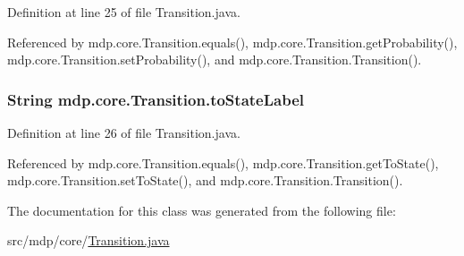 Definition at line 25 of file Transition.\+java.



Referenced by mdp.\+core.\+Transition.\+equals(), mdp.\+core.\+Transition.\+get\+Probability(), mdp.\+core.\+Transition.\+set\+Probability(), and mdp.\+core.\+Transition.\+Transition().

\hypertarget{classmdp_1_1core_1_1_transition_ac820d803424e51b25a3a6c895b94a33a}{}
\subsubsection[{to\+State\+Label}]{\setlength{\rightskip}{0pt plus 5cm}String mdp.\+core.\+Transition.\+to\+State\+Label\hspace{0.3cm}{\ttfamily [private]}}\label{classmdp_1_1core_1_1_transition_ac820d803424e51b25a3a6c895b94a33a}


Definition at line 26 of file Transition.\+java.



Referenced by mdp.\+core.\+Transition.\+equals(), mdp.\+core.\+Transition.\+get\+To\+State(), mdp.\+core.\+Transition.\+set\+To\+State(), and mdp.\+core.\+Transition.\+Transition().



The documentation for this class was generated from the following file\+:\begin{DoxyCompactItemize}
\item 
src/mdp/core/\hyperlink{_transition_8java}{Transition.\+java}\end{DoxyCompactItemize}
